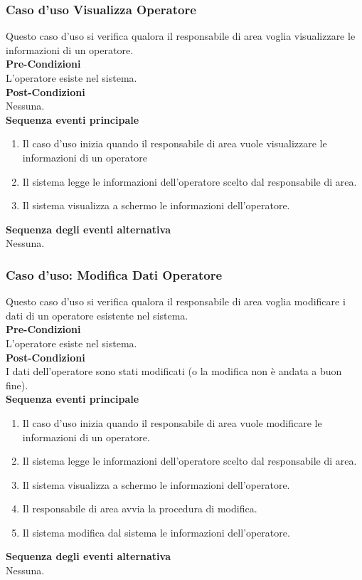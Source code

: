 \documentclass[green, fancy, 11pt]{elegantbook}
\begin{document}
\subsubsection{Caso d'uso Visualizza Operatore}

Questo caso d’uso si verifica qualora il responsabile di area voglia visualizzare le informazioni di un operatore.\\
\textbf{Pre-Condizioni}\\
L’operatore esiste nel sistema.\\
\textbf{Post-Condizioni}\\
Nessuna.\\
\textbf{Sequenza eventi principale}
\begin{enumerate}
	\item Il caso d’uso inizia quando il responsabile di area vuole visualizzare le informazioni di un operatore
	\item Il sistema legge le informazioni dell’operatore scelto dal responsabile di area.
	\item Il sistema visualizza a schermo le informazioni dell’operatore.
\end{enumerate}
\textbf{Sequenza degli eventi alternativa}\\
Nessuna.

\subsubsection{Caso d'uso: Modifica Dati Operatore}

Questo caso d’uso si verifica qualora il responsabile di area voglia modificare i dati di un operatore esistente nel sistema.\\
\textbf{Pre-Condizioni}\\
L’operatore esiste nel sistema.\\
\textbf{Post-Condizioni}\\
I dati dell'operatore sono stati modificati (o la modifica non è andata a buon fine).\\
\textbf{Sequenza eventi principale}
\begin{enumerate}
	\item Il caso d’uso inizia quando il responsabile di area vuole modificare le informazioni di un operatore.
	\item Il sistema legge le informazioni dell’operatore scelto dal responsabile di area.
	\item Il sistema visualizza a schermo le informazioni dell’operatore.
	\item Il responsabile di area avvia la procedura di modifica.
	\item Il sistema modifica dal sistema le informazioni dell’operatore.
\end{enumerate}
\textbf{Sequenza degli eventi alternativa}\\
Nessuna.
\end{document}
